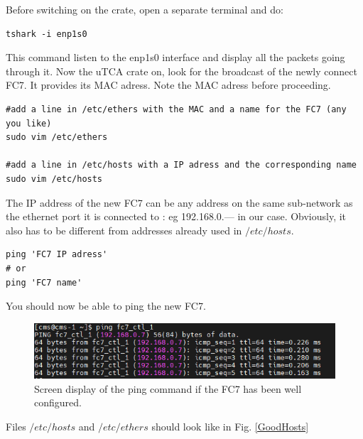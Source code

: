 \documentclass[10pt,a4paper]{article}
\begin{document}
Before switching on the crate, open a separate terminal and do:

\begin{framed}
\begin{verbatim}
tshark -i enp1s0  
\end{verbatim}
\end{framed}

This command listen to the enp1s0 interface and display all the packets going through it.
Now the uTCA crate on,  look for the broadcast of the newly connect FC7. It provides its MAC  adress. Note the MAC adress before proceeding.

\begin{framed}
\begin{verbatim}
#add a line in /etc/ethers with the MAC and a name for the FC7 (any you like)
sudo vim /etc/ethers 

#add a line in /etc/hosts with a IP adress and the corresponding name
sudo vim /etc/hosts  
\end{verbatim}
\end{framed}

The IP address of the new FC7 can be any address on the same sub-network as the ethernet port it is connected to : eg 192.168.0.---  in our case. Obviously, it also has to be different from addresses already used in $/etc/hosts $.

\begin{framed}
\begin{verbatim}
ping 'FC7 IP adress'
# or
ping 'FC7 name'
\end{verbatim}
\end{framed}

You should now be able to ping the new FC7. 

\begin{figure}[h!]
\centering
 \includegraphics[width=0.8\linewidth]{PingResponse.png} 
  \caption{Screen display of the ping command if the FC7 has been well configured.}
  \label{GoodPing}
\end{figure}

Files $/etc/hosts$ and $/etc/ethers$ should look like in Fig. \ref{GoodHosts}
\end{document}
